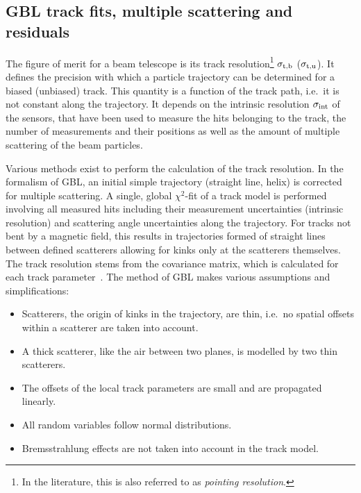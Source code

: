 \subsection{GBL track fits, multiple scattering and residuals}
\label{sec:resmultiple}

The figure of merit for a beam telescope is its track resolution\footnote{In the literature, this is also referred to as \textit{pointing resolution}.} $\sigma_{\textrm{t,b}}$ ($\sigma_{\textrm{t,u}}$).
It defines the precision with which a particle trajectory can be determined for a biased (unbiased) track. 
This quantity is a function of the track path, i.e.\ it is not constant along the trajectory. 
It depends on the intrinsic resolution $\sigma_{\textrm{int}}$ of the sensors, that have been used to measure the hits belonging to the track, the number of measurements and their positions
 as well as the amount of multiple scattering of the beam particles.
 
Various methods exist to perform the calculation of the track resolution. 
In the formalism of GBL, an initial simple trajectory (straight line, helix) is corrected for multiple scattering. 
A single, global $\chi^2$-fit of a track model is performed involving all measured hits including their measurement uncertainties (intrinsic resolution)
 and scattering angle uncertainties along the trajectory. 
For tracks not bent by a magnetic field, this results in trajectories formed of straight lines between defined scatterers allowing for kinks only at the scatterers themselves. 
The track resolution stems from the covariance matrix, which is calculated for each track parameter~\cite{Blobel20111760,Kleinwort-2012}. 
The method of GBL makes various assumptions and simplifications:

\begin{itemize}
 \item Scatterers, the origin of kinks in the trajectory, are thin, i.e.\ no spatial offsets within a scatterer are taken into account. 
 \item A thick scatterer, like the air between two planes, is modelled by two thin scatterers. 
 \item The offsets of the local track parameters are small and are propagated linearly. 
 \item All random variables follow normal distributions.
 \item Bremsstrahlung effects are not taken into account in the track model. 
\end{itemize}
 
